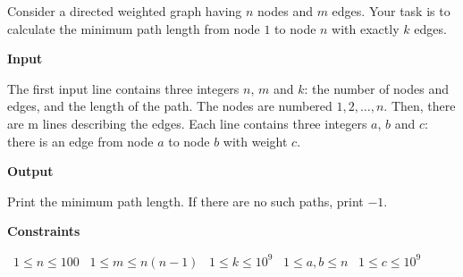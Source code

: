 Consider a directed weighted graph having $n$ nodes and $m$ edges. Your task is to calculate the minimum path length from node $1$ to node $n$ with exactly $k$ edges.

\vspace{0.3cm}\noindent\textbf{Input}

The first input line contains three integers $n$, $m$ and $k$: the number of nodes and edges, and the length of the path. The nodes are numbered $1,2,\dots,n$.
Then, there are m lines describing the edges. Each line contains three integers $a$, $b$ and $c$: there is an edge from node $a$ to node $b$ with weight $c$.

\vspace{0.3cm}\noindent\textbf{Output}

Print the minimum path length. If there are no such paths, print $-1$.

\vspace{0.3cm}\noindent\textbf{Constraints}

\textbullet\ $1 \le n \le 100$
\textbullet\ $1 \le m \le n(n-1)$
\textbullet\ $1 \le k \le 10^9$
\textbullet\ $1 \le a,b \le n$
\textbullet\ $1 \le c \le 10^9$